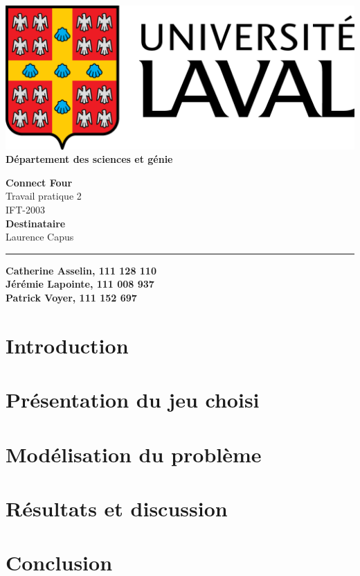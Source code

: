 \documentclass[12pt]{article}
\begin{document}
\begin{titlepage}
	\begin{minipage}{0.5\textwidth}
		\begin{flushleft}
			\includegraphics[scale=0.1]{logo.png} \\
			\textbf{Département des sciences et génie}
		\end{flushleft}
	\end{minipage}	
	\vspace{150px}
	\begin{center} \large
		\textbf{Connect Four} \\
		Travail pratique 2 \\
		IFT-2003 \\
		\vspace{150px}
		\textbf{Destinataire} \\
		Laurence Capus
	\end{center}
	\vfill
	\rule{\linewidth}{.5pt}
	\newline	
	\textbf{Catherine Asselin, 111 128 110} \\
	\textbf{Jérémie Lapointe, 111 008 937} \\
	\textbf{Patrick Voyer, 111 152 697} 
\end{titlepage}

\newpage
\setcounter{page}{1}

\section*{Introduction}
\section*{Présentation du jeu choisi}
\section*{Modélisation du problème}
\section*{Résultats et discussion}
\section*{Conclusion}
\end{document}
